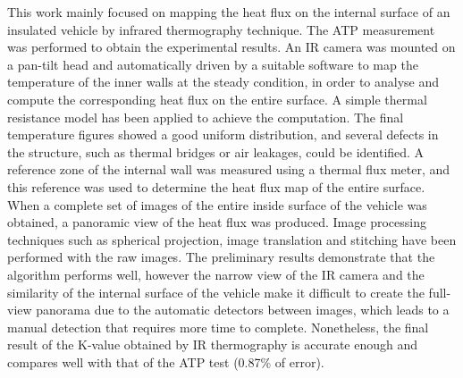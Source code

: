 \documentclass{tQRT2e}
\begin{document}
This work  mainly focused on mapping the heat flux on the internal surface of an insulated vehicle by infrared thermography technique. The ATP measurement was performed to obtain the experimental results. An IR camera was mounted on a pan-tilt head and automatically driven by a suitable software to map the temperature of the inner walls at the steady condition, in order to analyse and compute the corresponding heat flux on the entire surface. A simple thermal resistance model has been applied to achieve the computation. The final temperature figures showed a good uniform distribution, and several defects in the structure, such as thermal bridges or air leakages, could be identified. A reference zone of the internal wall was measured using a thermal flux meter, and this reference was used to determine the heat flux map of the entire surface. When a complete set of images of the entire inside surface of the vehicle was obtained, a panoramic view of the heat flux was produced. Image processing techniques such as spherical projection, image translation and stitching have been performed with the raw images. The preliminary results demonstrate that the algorithm performs well, however the narrow view of the IR camera and the similarity of the internal surface of the vehicle make it difficult to create the full-view panorama due to the automatic detectors between images, which leads to a manual detection that requires more time to complete. Nonetheless, the final result of the K-value obtained by IR thermography is accurate enough and compares well with that of the ATP test (0.87\% of error).



\end{document}
